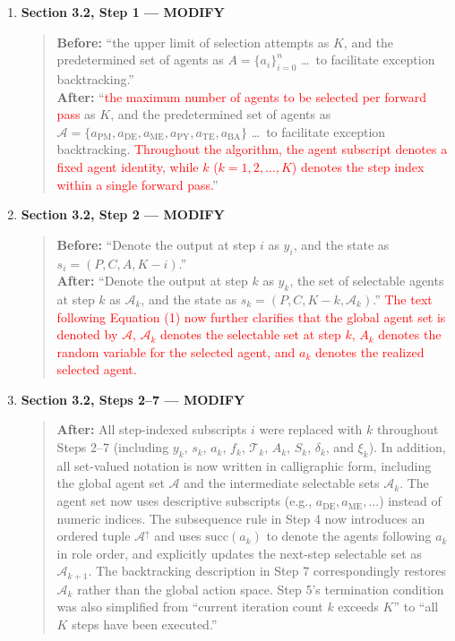 \documentclass[11pt,a4paper]{article}
\begin{document}
\begin{enumerate}
\item \textbf{Section 3.2, Step 1 --- MODIFY}
\begin{quote}
\textbf{Before:} ``the upper limit of selection attempts as $K$, and the predetermined set of agents as $A=\{a_i\}_{i=0}^n$ \ldots\ to facilitate exception backtracking.''\\[4pt]
\textbf{After:} ``\textcolor{red}{the maximum number of agents to be selected per forward pass} as $K$, and the predetermined set of agents as $\mathcal{A}=\{a_{\text{PM}}, a_{\text{DE}}, a_{\text{ME}}, a_{\text{PY}}, a_{\text{TE}}, a_{\text{BA}}\}$ \ldots\ to facilitate exception backtracking. \textcolor{red}{Throughout the algorithm, the agent subscript denotes a fixed agent identity, while $k$ ($k = 1, 2, \ldots, K$) denotes the step index within a single forward pass.}''
\end{quote}

\item \textbf{Section 3.2, Step 2 --- MODIFY}
\begin{quote}
\textbf{Before:} ``Denote the output at step $i$ as $y_i$, and the state as $s_i=(P,C,A,K-i)$.''\\[4pt]
\textbf{After:} ``Denote the output at step $k$ as $y_k$, the set of selectable agents at step $k$ as $\mathcal{A}_k$, and the state as $s_k=(P, C, K-k, \mathcal{A}_k)$.'' \textcolor{red}{The text following Equation (1) now further clarifies that the global agent set is denoted by $\mathcal{A}$, $\mathcal{A}_k$ denotes the selectable set at step $k$, $A_k$ denotes the random variable for the selected agent, and $a_k$ denotes the realized selected agent.}
\end{quote}

\item \textbf{Section 3.2, Steps 2--7 --- MODIFY}
\begin{quote}
\textbf{After:} All step-indexed subscripts $i$ were replaced with $k$ throughout Steps 2--7 (including $y_k$, $s_k$, $a_k$, $f_k$, $\mathcal{T}_k$, $A_k$, $S_k$, $\delta_k$, and $\xi_k$). In addition, all set-valued notation is now written in calligraphic form, including the global agent set $\mathcal{A}$ and the intermediate selectable sets $\mathcal{A}_k$. The agent set now uses descriptive subscripts (e.g., $a_{\text{DE}}, a_{\text{ME}}, \ldots$) instead of numeric indices. The subsequence rule in Step 4 now introduces an ordered tuple $\mathcal{A}^{\uparrow}$ and uses $\mathrm{succ}(a_k)$ to denote the agents following $a_k$ in role order, and explicitly updates the next-step selectable set as $\mathcal{A}_{k+1}$. The backtracking description in Step 7 correspondingly restores $\mathcal{A}_k$ rather than the global action space. Step 5's termination condition was also simplified from ``current iteration count $k$ exceeds $K$'' to ``all $K$ steps have been executed.''
\end{quote}


\end{enumerate}
\end{document}
